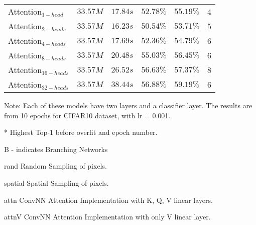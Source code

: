 \documentclass{article}
\begin{document}
\begin{table}[h]
\begin{threeparttable}
\begin{tabular}{@{}l|l|l|l|l|l@{}}
      \midrule
      Attention\(_{1-head}\)                     & \(33.57M\) & \(17.84s\) & \(52.78\%\) & \(55.19\%\) & 4 \\
      Attention\(_{2-heads}\)                    & \(33.57M\) & \(16.23s\) & \(50.54\%\) & \(53.71\%\) & 5 \\
      Attention\(_{4-heads}\)                    & \(33.57M\) & \(17.69s\) & \(52.36\%\) & \(54.79\%\) & 6 \\
      Attention\(_{8-heads}\)                    & \(33.57M\) & \(20.48s\) & \(55.03\%\) & \(56.45\%\) & 6 \\
      Attention\(_{16-heads}\)                   & \(33.57M\) & \(26.52s\) & \(56.63\%\) & \(57.37\%\) & 8 \\
      Attention\(_{32-heads}\)                   & \(33.57M\) & \(38.44s\) & \(56.88\%\) & \(59.19\%\) & 6 \\
      \bottomrule
      
    \end{tabular}
    \begin{tablenotes}
      \centering               
      \footnotesize
      \item Note: Each of these models have two layers and a classifier layer. The results are from 10 epochs for CIFAR10 dataset, with lr = 0.001.
      \item[*] Highest Top-1 before overfit and epoch number. 
      \item[B] - indicates Branching Networks
      \item[rand] Random Sampling of pixels.
      \item[spatial] Spatial Sampling of pixels.
      \item[attn] ConvNN Attention Implementation with K, Q, V linear layers.
      \item[attnV] ConvNN Attention Implementation with only V linear layer.
    \end{tablenotes}
  \end{threeparttable}
\end{table}
\end{document}
